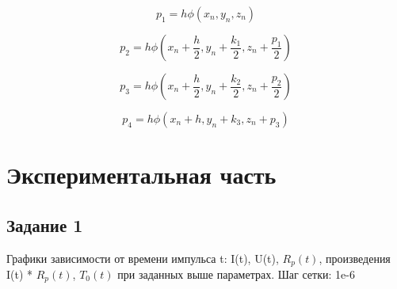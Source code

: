 \documentclass[a4paper,oneside,12pt]{extreport}
\begin{document}
\begin{equation*}
    p_1 = h\phi(x_n,y_n,z_n)
\end{equation*}

\begin{equation*}
    p_2 = h\phi(x_n + \frac{h}{2},y_n+\frac{k_1}{2},z_n+\frac{p_1}{2})
\end{equation*}

\begin{equation*}
    p_3 = h\phi(x_n + \frac{h}{2},y_n+\frac{k_2}{2},z_n+\frac{p_2}{2})
\end{equation*}

\begin{equation*}
    p_4 = h\phi(x_n + h,y_n+k_3,z_n+p_3)
\end{equation*}

\newpage 

\section{Экспериментальная часть}

\subsection{Задание 1}

Графики зависимости от времени импульса t: I(t), U(t), $R_p(t)$, 
произведения I(t) * $R_p(t)$, $T_0(t)$ при заданных выше параметрах.
Шаг сетки: 1e-6

\begin{figure}[ht!]
\end{figure}
\end{document}
